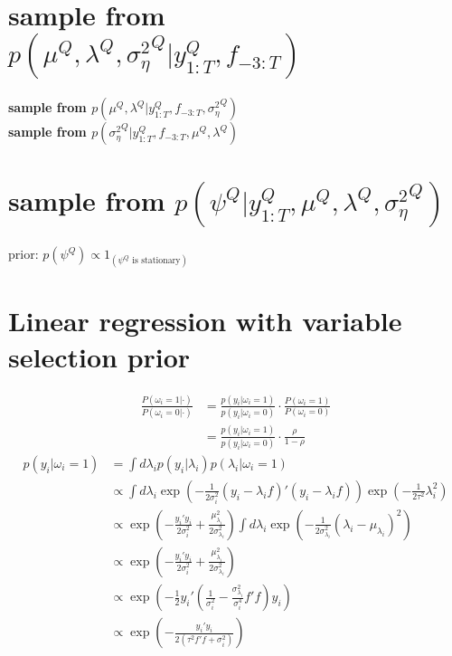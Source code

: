 \section{sample from $p(\mu^Q, \lambda^Q, {\sigma^2_\eta}^Q|y^Q_{1:T}, f_{-3:T})$}

\textbf{sample from $p(\mu^Q, \lambda^Q|y^Q_{1:T}, f_{-3:T}, {\sigma^2_\eta}^Q)$}\\

\noindent \textbf{sample from $p({\sigma^2_\eta}^Q|y^Q_{1:T}, f_{-3:T}, \mu^Q, \lambda^Q)$}\\

\section{sample from $p(\psi^Q|y^Q_{1:T}, \mu^Q, \lambda^Q, {\sigma^2_\eta}^Q)$}

prior: $p(\psi^Q) \propto 1_{(\psi^Q\text{ is stationary})}$

\section{Linear regression with variable selection prior}



\begin{align}
\frac{P(\omega_i=1|\cdot)}{P(\omega_i=0|\cdot)} &= \frac{p(y_i|\omega_i=1)}{p(y_i|\omega_i=0)}\cdot \frac{P(\omega_i=1)}{P(\omega_i=0)} \\
&= \frac{p(y_i|\omega_i=1)}{p(y_i|\omega_i=0)}\cdot\frac{\rho}{1-\rho}
\end{align}
\begin{align}
p(y_i|\omega_i=1) &= \int d\lambda_i p(y_i|\lambda_i) p(\lambda_i|\omega_i=1) \\
&\propto \int d\lambda_i \exp{\left(-\frac{1}{2\sigma_i^2}(y_i-\lambda_i f)'(y_i-\lambda_i f)\right)} \exp{\left(-\frac{1}{2\tau^2}\lambda_i^2\right)} \\ 
&\propto \exp{\left(-\frac{y_i'y_i}{2\sigma_i^2} + \frac{\mu_{\lambda_i}^2}{2\sigma_{\lambda_i}^2}\right)} \int d\lambda_i \exp{\left(-\frac{1}{2\sigma_{\lambda_i}^2}(\lambda_i - \mu_{\lambda_i})^2\right)} \\
&\propto \exp{\left(-\frac{y_i'y_i}{2\sigma_i^2} + \frac{\mu_{\lambda_i}^2}{2\sigma_{\lambda_i}^2}\right)} \\
&\propto \exp{\left(-\frac{1}{2}y_i'\left(\frac{1}{\sigma_i^2} - \frac{\sigma_{\lambda_i}^2}{\sigma_i^4} f'f\right)y_i\right)} \\
&\propto \exp{\left(-\frac{y_i'y_i}{2({\tau^2 f'f + \sigma_i^2})}\right)}
\end{align}

